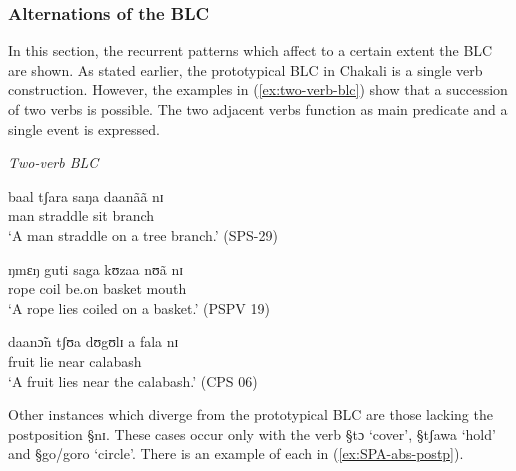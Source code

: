 




\subsubsection{Alternations of the BLC}
\label{sec:SPA-modulatedBLC}

In this section,   the  recurrent patterns which affect to a certain extent the
BLC are shown. As stated earlier, the prototypical BLC in Chakali is a single
verb construction. However,  the examples in (\ref{ex:two-verb-blc}) show  that
a succession of two verbs is possible. The   two adjacent verbs function as main
predicate and a  single event is expressed.

\begin{exe}
\ex\label{ex:two-verb-blc}{\it Two-verb BLC}
\begin{xlist}

\ex\label{ex:SPS-29}
\gll baal tʃara saŋa daanãã nɪ \\
man straddle sit branch {\postp}\\
\glt `A man straddle on a tree branch.' (SPS-29)

\ex\label{ex:TRPS30b}
\gll  ŋmɛŋ guti saga kʊzaa nʊã nɪ\\
 rope coil be.on basket mouth  {\postp}\\
\glt `A rope lies coiled on a basket.' (PSPV 19)


\ex\label{ex:CPS-06}
\gll  daanɔ̃n tʃʊa dʊgʊlɪ a fala nɪ\\
fruit lie near {\art} calabash {\postp} \\
\glt `A fruit lies near the calabash.' (CPS 06)


\end{xlist}
\end{exe}

Other instances which
diverge from the prototypical BLC are those lacking the postposition {\S nɪ}.
These cases occur only with the verb {\S tɔ} `cover', {\S tʃawa}
`hold' and {\S go/goro} `circle'. 
There is an example of each in (\ref{ex:SPA-abs-postp}).

